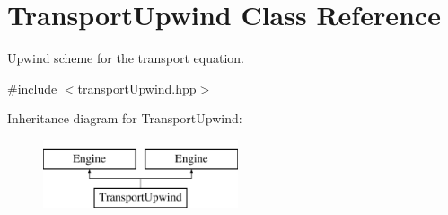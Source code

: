 \hypertarget{classTransportUpwind}{}\section{Transport\+Upwind Class Reference}
\label{classTransportUpwind}


Upwind scheme for the transport equation.  




{\ttfamily \#include $<$transport\+Upwind.\+hpp$>$}

Inheritance diagram for Transport\+Upwind\+:\begin{figure}[H]
\begin{center}
\leavevmode
\includegraphics[height=2.000000cm]{classTransportUpwind}
\end{center}
\end{figure}
